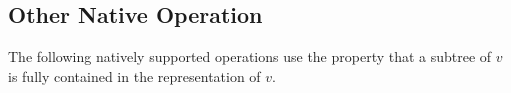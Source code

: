 \begin{algorithm}
\begin{algorithmic}
	\State {}
\EndFunction
\end{algorithmic}
\end{algorithm}

\begin{algorithm}
\begin{algorithmic}
	\State {}
\EndFunction
\end{algorithmic}
\end{algorithm}

\begin{algorithm}
\begin{algorithmic}
	\State {}
\EndFunction
\end{algorithmic}
\end{algorithm}

\begin{algorithm}
\begin{algorithmic}
	\State {}
\EndFunction
\end{algorithmic}
\end{algorithm}

\subsection{Other Native Operation}\label{ss:bp-other}

The following natively supported operations use the property that a subtree of $v$ is fully contained in the representation of $v$.

\begin{algorithm}
\begin{algorithmic}
	\State {}
\EndFunction
\end{algorithmic}
\end{algorithm}

\begin{algorithm}
\begin{algorithmic}
	\State {}
\EndFunction
\end{algorithmic}
\end{algorithm}

\begin{algorithm}
\begin{algorithmic}
	\State {}
\EndFunction
\end{algorithmic}
\end{algorithm}


